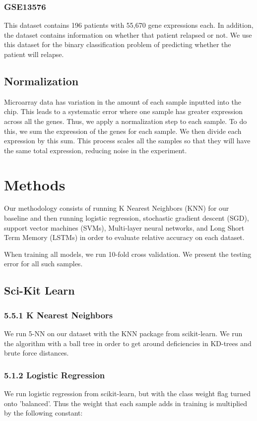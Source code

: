\documentclass[12pt]{scrartcl}
\begin{document}
    \subsubsection{GSE13576}
    This dataset contains 196 patients with 55,670 gene expressions each. In addition, the dataset contains information on whether that patient relapsed or not. We use this dataset for the binary classification problem of predicting whether the patient will relapse. 

    \subsection{Normalization}
Microarray data has variation in the amount of each sample inputted into the chip. This leads to a systematic error where one sample has greater expression across all the genes. Thus, we apply a normalization step to each sample. To do this, we sum the expression of the genes for each sample. We then divide each expression by this sum. This process scales all the samples so that they will have the same total expression, reducing  noise in the experiment.
    \section{Methods}
    Our methodology consists of running K Nearest Neighbors (KNN) for our baseline and then running logistic regression, stochastic gradient descent (SGD), support vector machines (SVMs), Multi-layer neural networks, and Long Short Term Memory (LSTMs) in order to evaluate relative accuracy on each dataset.
    
    When training all models, we run 10-fold cross validation. We present the testing error for all such samples. 

    \subsection{Sci-Kit Learn}
    \subsubsection*{5.5.1 K Nearest Neighbors}
    We run 5-NN on our dataset with the KNN package from scikit-learn. We run the algorithm with a ball tree in order to get around deficiencies in KD-trees and brute force distances. 
    
    \subsubsection*{5.1.2 Logistic Regression}
    We run logistic regression from scikit-learn, but with the class weight flag turned onto 'balanced'. Thus the weight that each sample adds in training is multiplied by the following constant:
    
\end{document}
